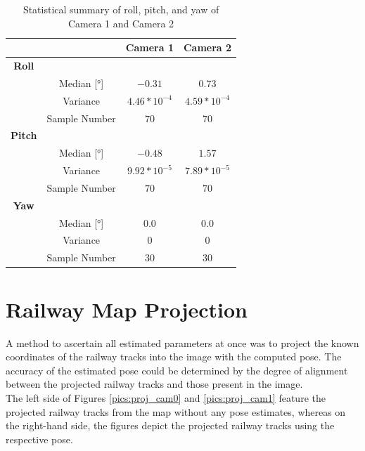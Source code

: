 \begin{table}[h!]
\centering
\begin{tabular}{c c c c}
& & \textbf{Camera 1} & \textbf{Camera 2} \\
\midrule
\textbf{Roll} &  & & \\
& Median [°] & $-0.31$&$ 0.73$\\
&Variance & $4.46 *10^{-4}$ & $4.59*10^{-4} $\\
&Sample Number & $70$ & $70 $\\
\midrule
\textbf{Pitch} & &  & \\
&Median [°]& $-0.48$ & $1.57$\\
&Variance & $9.92 * 10 ^{-5}$ & $7.89 * 10 ^{-5}$\\
&Sample Number & $70$ & $70 $\\
\midrule
\textbf{Yaw} &  & & \\
&Median [°] & $0.0$& $0.0$\\
&Variance &$ 0$ & $0$\\
&Sample Number & $30$ & $30$ \\
\bottomrule
\end{tabular}
\caption{Statistical summary of roll, pitch, and yaw of Camera 1 and Camera 2}
\label{tab:indiv_rot}
\end{table}










\newpage
\section{Railway Map Projection}
A method to ascertain all estimated parameters at once was to project the known coordinates of the railway tracks into the image with the computed pose. The accuracy of the estimated pose could be determined by the degree of alignment between the projected railway tracks and those present in the image.\\

The left side of Figures \ref{pics:proj_cam0} and \ref{pics:proj_cam1} feature the projected railway tracks from the map without any pose estimates, whereas on the right-hand side, the figures depict the projected railway tracks using the respective pose. \\

